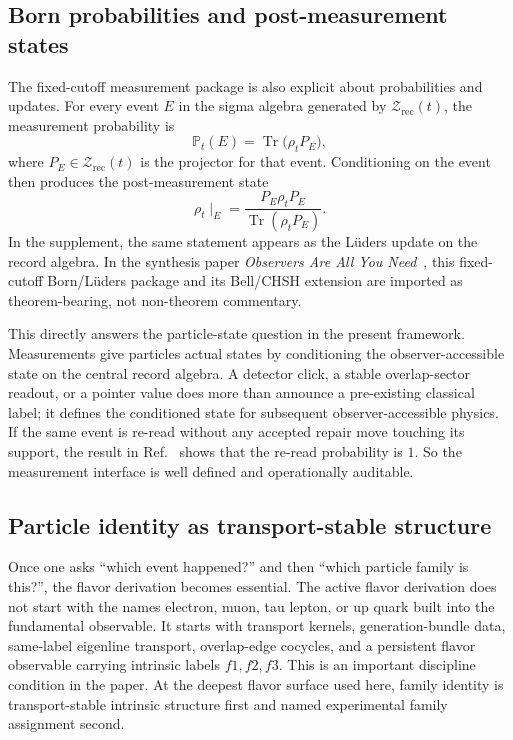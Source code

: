 \documentclass[11pt]{article}
\begin{document}
\subsection{Born probabilities and post-measurement states}

The fixed-cutoff measurement package is also explicit about probabilities and updates. For every
event \(E\) in the sigma algebra generated by \(\mathcal Z_{\mathrm{rec}}(t)\), the measurement
probability is
\[
\mathbb P_t(E)=\operatorname{Tr}\!\bigl(\rho_t P_E\bigr),
\]
where \(P_E\in\mathcal Z_{\mathrm{rec}}(t)\) is the projector for that event. Conditioning on the
event then produces the post-measurement state
\[
\rho_t\!\mid_E
=
\frac{P_E\rho_t P_E}{\operatorname{Tr}(\rho_t P_E)}.
\]
In the supplement, the same statement appears as the L\"uders update on the record algebra. In
the synthesis paper \emph{Observers Are All You Need}~\cite{ophsynthesis}, this fixed-cutoff
Born/L\"uders package and its Bell/CHSH extension are imported as theorem-bearing, not
non-theorem commentary.

This directly answers the particle-state question in the present framework. Measurements give particles
actual states by conditioning the observer-accessible state on the central record algebra. A
detector click, a stable overlap-sector readout, or a pointer value does more than announce a
pre-existing classical label; it defines the conditioned state for subsequent observer-accessible
physics. If the same event is re-read without any accepted repair move touching its support, the
result in Ref.~\cite{ophmicrophysics} shows that the re-read probability is \(1\). So the measurement interface is
well defined and operationally auditable.

\subsection{Particle identity as transport-stable structure}

Once one asks ``which event happened?'' and then ``which particle family is this?'', the
flavor derivation becomes essential. The active flavor derivation does not start with the
names electron, muon, tau lepton, or up quark built into the fundamental observable. It starts
with transport kernels, generation-bundle data, same-label eigenline transport, overlap-edge
cocycles, and a persistent flavor observable carrying intrinsic labels \(f1,f2,f3\). This is an
important discipline condition in the paper. At the deepest flavor surface used here, family
identity is transport-stable intrinsic structure first and named experimental family assignment
second.
\end{document}
